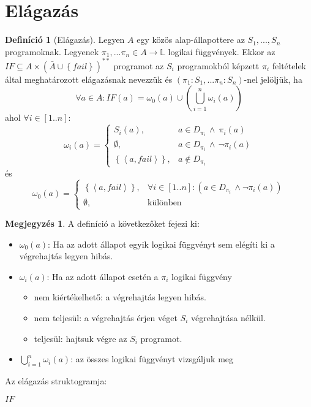 \documentclass[a4paper,12pt]{article}
\theoremstyle{definition}
\newtheorem*{definition*}{Definíció}
\newtheorem*{remark}{Megjegyzés}
\begin{document}
	\newpage
	\section{Elágazás}
	
	\begin{definition*}[Elágazás]
		Legyen $A$ egy közös alap-állapottere az $S_1,...,S_n$ programoknak. Legyenek $\pi_1,...\pi_n \in A \rightarrow \mathbb{L}$ logikai függvények. Ekkor az $IF \subseteq A \times \left(\bar{A} \cup \left\{ fail \right\} \right)^{**}$ programot az $S_i$ programokból képzett $\pi_i$ feltételek által meghatározott elágazásnak nevezzük és $ \left( \pi_1:S_1,...\pi_n:S_n \right) $-nel jelöljük, ha
		\[ \forall a \in A: IF(a) = \omega_0(a) \cup \left( \bigcup_{i=1}^{n}{\omega_i(a)} \right)  \]
		ahol $ \forall i \in [1..n]: $
		\[
		\omega_i(a) = \begin{cases}
			S_i(a),& a \in D_{\pi_i} \, \land \ \pi_i(a) \\
			\emptyset,& a \in D_{\pi_i} \, \land \, \lnot \pi_i(a) \\
			\left\lbrace \left\langle a, fail \right\rangle  \right\rbrace,&  a \notin D_{\pi_i}
		\end{cases}
		\]
		és
		\[
		\omega_0(a) = \begin{cases}
			\left\lbrace \left\langle a, fail \right\rangle  \right\rbrace,&  \forall i \in [1..n]: (a \in D_{\pi_i} \, \land \lnot \pi_i(a)) \\
			\emptyset,& \text{különben}
		\end{cases}
		\]
		\begin{remark}
			A definíció a következőket fejezi ki:
			\begin{itemize}
				\item $\omega_0(a)$: Ha az adott állapot egyik logikai függvényt sem elégíti ki a végrehajtás legyen hibás.
				\item $\omega_i(a)$: Ha az adott állapot esetén a $\pi_i$ logikai függvény  \begin{itemize}
					\item nem kiértékelhető: a végrehajtás legyen hibás.
					\item nem teljesül: a végrehajtás érjen véget $S_i$ végrehajtása nélkül.
					\item teljesül: hajtsuk végre az $S_i$ programot.
				\end{itemize}
				\item $\bigcup_{i=1}^{n}{\omega_i(a)}$: az összes logikai függvényt vizsgáljuk meg
			\end{itemize}
		\end{remark}
	Az elágazás struktogramja:
	\begin{stuki*}[5cm]{$IF$}
		\begin{CASE}{3}{3}
		\end{CASE}
	\end{stuki*}
	\end{definition*}
\end{document}

